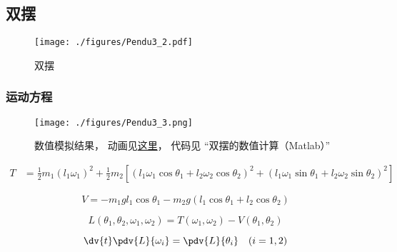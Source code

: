 
\begin{issues}
\issueDraft
\end{issues}


\subsection{双摆}
\begin{figure}[ht]
\centering
\texttt{[image: ./figures/Pendu3\_2.pdf]}
\caption{双摆} \label{Pendu3_fig2}
\end{figure}

\subsubsection{运动方程}
\begin{figure}[ht]
\centering
\texttt{[image: ./figures/Pendu3\_3.png]}
\caption{数值模拟结果， 动画见\href{https://wuli.wiki/apps/DbPend.html}{这里}， 代码见 “双摆的数值计算（Matlab）”} \label{Pendu3_fig3}
\end{figure}

\begin{equation}
\begin{aligned}
T &= \frac{1}{2} m_1 (l_1 \omega_1)^2 + \frac{1}{2} m_2 [(l_1 \omega_1 \cos\theta_1 + l_2 \omega_2 \cos\theta_2)^2 + (l_1 \omega_1 \sin\theta_1 + l_2 \omega_2 \sin\theta_2)^2]
\end{aligned}
\end{equation}

\begin{equation}  
V = -m_1 g l_1 \cos \theta_1 - m_2 g (l_1\cos \theta_1 + l_2 \cos \theta_2)
\end{equation}

\begin{equation}
L(\theta_1, \theta_2, \omega_1, \omega_2) = T(\omega_1, \omega_2) - V(\theta_1, \theta_2)
\end{equation}

\begin{equation}\label{Pendu3_eq1}
\dv{t}\pdv{L}{\omega_i} = \pdv{L}{\theta_i} \quad (i=1,2)
\end{equation}

